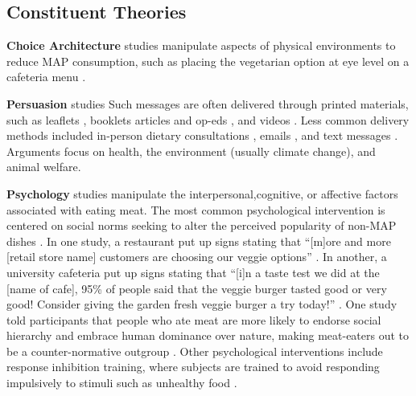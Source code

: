 \documentclass[sn-nature,referee,pdflatex]{sn-jnl}
\begin{document}
\subsection{Constituent Theories}\label{sec2.2}

\textbf{Choice Architecture} studies
\citep{andersson2021, kanchanachitra2020} manipulate aspects of physical
environments to reduce MAP consumption, such as placing the vegetarian
option at eye level on a cafeteria menu \citep{andersson2021}.

\textbf{Persuasion} studies
\citep{kanchanachitra2020, aberman2018, abrahamse2007, acharya2004, banerjee2019, bianchi2022, bochmann2017, bschaden2020, carfora2023, hennessy2016, piester2020, cooney2014, cooney2016, feltz2022, haile2021, hatami2018, jalil2023, mathur2021effectiveness, merrill2009, norris2014, peacock2017, polanco2022, sparkman2021, weingarten2022}
Such messages are often delivered through printed materials, such as
leaflets \citep{haile2021, polanco2022}, booklets \citep{bianchi2022}
articles and op-eds \citep{sparkman2021, feltz2022}, and videos
\citep{sparkman2021, cooney2016, mathur2021effectiveness}. Less common
delivery methods included in-person dietary consultations
\citep{merrill2009}, emails \citep{banerjee2019}, and text messages
\citep{carfora2023}. Arguments focus on health, the environment (usually
climate change), and animal welfare.

\textbf{Psychology} studies
\citep{aldoh2023, allen2002, camp2019, coker2022, piester2020, sparkman2020}
manipulate the interpersonal,cognitive, or affective factors associated
with eating meat. The most common psychological intervention is centered
on social norms seeking to alter the perceived popularity of non-MAP
dishes \citep{sparkman2020}. In one study, a restaurant put up signs
stating that ``{[}m{]}ore and more {[}retail store name{]} customers are
choosing our veggie options'' \citep{coker2022}. In another, a
university cafeteria put up signs stating that ``{[}i{]}n a taste test
we did at the {[}name of cafe{]}, 95\% of people said that the veggie
burger tasted good or very good! Consider giving the garden fresh veggie
burger a try today!'' \citep{piester2020}. One study told participants
that people who ate meat are more likely to endorse social hierarchy and
embrace human dominance over nature, making meat-eaters out to be a
counter-normative outgroup \citep{allen2002}. Other psychological
interventions include response inhibition training, where subjects are
trained to avoid responding impulsively to stimuli such as unhealthy
food \citep{camp2019}.
\end{document}
